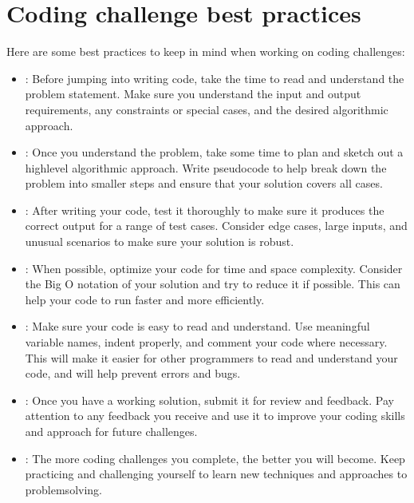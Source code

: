 \documentclass[letterpaper,12pt,english]{book}
\begin{document}
\section{Coding challenge best practices}
\label{\detokenize{conclude:coding-challenge-best-practices}}
\sphinxAtStartPar
Here are some best practices to keep in mind when working on coding challenges:
\begin{itemize}
\item {} 
\sphinxAtStartPar
{}: Before jumping into writing code, take the time to read and understand the problem statement. Make sure you understand the input and output requirements, any constraints or special cases, and the desired algorithmic approach.

\item {} 
\sphinxAtStartPar
{}: Once you understand the problem, take some time to plan and sketch out a high\sphinxhyphen{}level algorithmic approach. Write pseudocode to help break down the problem into smaller steps and ensure that your solution covers all cases.

\item {} 
\sphinxAtStartPar
{}: After writing your code, test it thoroughly to make sure it produces the correct output for a range of test cases. Consider edge cases, large inputs, and unusual scenarios to make sure your solution is robust.

\item {} 
\sphinxAtStartPar
{}: When possible, optimize your code for time and space complexity. Consider the Big O notation of your solution and try to reduce it if possible. This can help your code to run faster and more efficiently.

\item {} 
\sphinxAtStartPar
{}: Make sure your code is easy to read and understand. Use meaningful variable names, indent properly, and comment your code where necessary. This will make it easier for other programmers to read and understand your code, and will help prevent errors and bugs.

\item {} 
\sphinxAtStartPar
{}: Once you have a working solution, submit it for review and feedback. Pay attention to any feedback you receive and use it to improve your coding skills and approach for future challenges.

\item {} 
\sphinxAtStartPar
{}: The more coding challenges you complete, the better you will become. Keep practicing and challenging yourself to learn new techniques and approaches to problem\sphinxhyphen{}solving.

\end{itemize}
\end{document}
